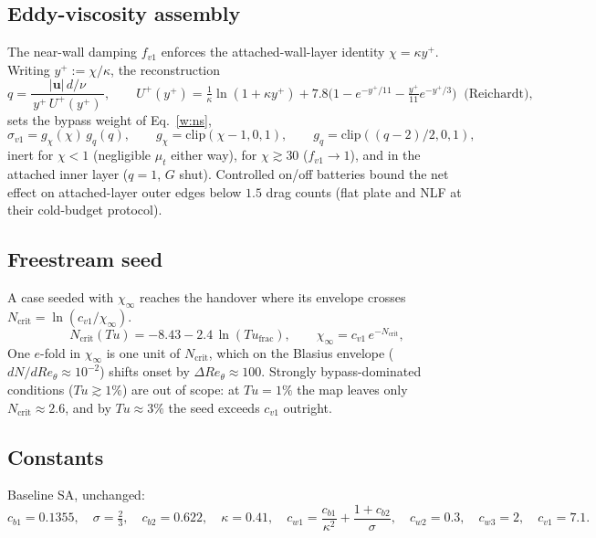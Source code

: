 \documentclass[10pt]{article}
\begin{document}
\subsection{Eddy-viscosity assembly}

The near-wall damping $f_{v1}$ enforces the attached-wall-layer
identity $\chi=\kappa y^+$. Writing $y^+:=\chi/\kappa$, the reconstruction
\begin{equation}
  q = \frac{|\mathbf u|\,d/\nu}{\,y^+\,U^+(y^+)\,},
  \qquad
  U^+(y^+)=\tfrac1\kappa\ln(1+\kappa y^+)
  +7.8\big(1-e^{-y^+/11}-\tfrac{y^+}{11}e^{-y^+/3}\big)
  \;\;\text{(Reichardt)},
  \label{w:fv1q}
\end{equation}
sets the bypass weight of Eq.~\eqref{w:ns},
\begin{equation}
  \sigma_{v1} = g_\chi(\chi)\,g_q(q), \qquad
  g_\chi=\mathrm{clip}(\chi-1,0,1), \qquad
  g_q=\mathrm{clip}((q-2)/2,0,1),
  \label{w:fv1bypass}
\end{equation}
inert for $\chi<1$ (negligible $\mu_t$ either way), for
$\chi\gtrsim30$ ($f_{v1}\to1$), and in the attached inner layer
($q=1$, $G$ shut). Controlled on/off batteries bound the net effect on
attached-layer outer edges below $1.5$ drag counts (flat plate and
NLF at their cold-budget protocol).

\subsection{Freestream seed}

A case seeded
with $\chi_\infty$ reaches the handover where its envelope crosses
$N_\mathrm{crit}=\ln(c_{v1}/\chi_\infty)$.
\begin{equation}
  N_\mathrm{crit}(Tu) = -8.43 - 2.4\,\ln(Tu_{\mathrm{frac}}),
  \qquad
  \chi_\infty = c_{v1}\,e^{-N_\mathrm{crit}},
  \label{w:mack}
\end{equation}
One
$e$-fold in $\chi_\infty$ is one unit of $N_\mathrm{crit}$, which on
the Blasius envelope ($dN/dRe_\theta\approx10^{-2}$) shifts onset by
$\Delta Re_\theta\approx100$. Strongly bypass-dominated conditions
($Tu\gtrsim1\%$) are out of scope: at $Tu=1\%$ the map leaves only
$N_\mathrm{crit}\approx2.6$, and by $Tu\approx3\%$ the seed exceeds
$c_{v1}$ outright.

\subsection{Constants}

Baseline SA, unchanged:
\begin{equation*}
  c_{b1}=0.1355,\quad \sigma=\tfrac{2}{3},\quad c_{b2}=0.622,\quad
  \kappa=0.41,\quad c_{w1}=\frac{c_{b1}}{\kappa^2}+\frac{1+c_{b2}}{\sigma},\quad
  c_{w2}=0.3,\quad c_{w3}=2,\quad c_{v1}=7.1 .
\end{equation*}
\end{document}

